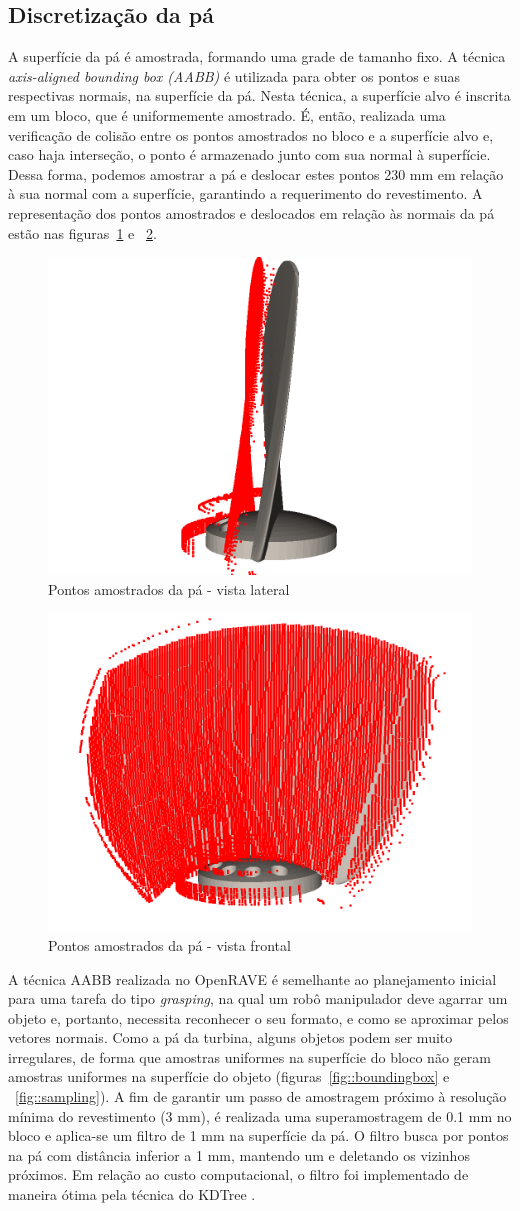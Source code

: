 \subsection{Discretização da pá}

A superfície da pá é amostrada, formando uma grade de tamanho fixo. A técnica
\textit{axis-aligned bounding box (AABB)} é utilizada para obter os
pontos e suas respectivas normais, na superfície da pá. Nesta técnica, a
superfície alvo é inscrita em um bloco, que é uniformemente amostrado. É, então,
realizada uma verificação de colisão entre os pontos amostrados no bloco e a
superfície alvo e, caso haja interseção, o ponto é armazenado junto com sua
normal à superfície. Dessa forma, podemos amostrar a pá e deslocar estes pontos
230 mm em relação à sua normal com a superfície, garantindo a requerimento do
revestimento. A representação dos pontos amostrados e deslocados em relação às
normais da pá estão nas figuras~\ref{fig::amostrapa1} e ~\ref{fig::amostrapa2}. 

\begin{figure}[!ht]
	\centering	
	\includegraphics[width=.3\columnwidth]{figs/amostrapa1.png}
	\caption{Pontos amostrados da pá - vista lateral}
	\label{fig::amostrapa1}
\end{figure}

\begin{figure}[!ht]	
	\centering
	\includegraphics[width=.3\columnwidth]{figs/amostrapa2.png}
	\caption{Pontos amostrados da pá - vista frontal}
	\label{fig::amostrapa2}
\end{figure}

A técnica AABB realizada no OpenRAVE é semelhante ao
planejamento inicial para uma tarefa do tipo \textit{grasping}, na qual um robô
manipulador deve agarrar um objeto e, portanto, necessita reconhecer o seu
formato, e como se aproximar pelos vetores normais. Como a pá da turbina, alguns
objetos podem ser muito irregulares, de forma que amostras uniformes na
superfície do bloco não geram amostras uniformes na superfície do objeto
(figuras~\ref{fig::boundingbox} e ~\ref{fig::sampling}). A fim de garantir um
passo de amostragem próximo à resolução mínima do revestimento (3 mm), é
realizada uma superamostragem de 0.1 mm no bloco e aplica-se um filtro de 1 mm
na superfície da pá. O filtro busca por pontos na pá com distância inferior a 1
mm, mantendo um e deletando os vizinhos próximos. Em relação ao custo
computacional, o filtro foi implementado de maneira ótima pela técnica do
KDTree \cite{wald2006building}.

